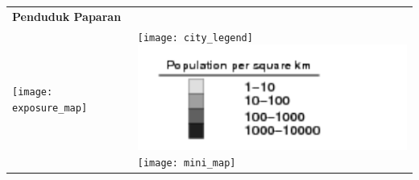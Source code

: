 \documentclass[a4paper]{article}
\begin{document}


\bigskip


\bigskip


\bigskip
\begin{tabular}{@{}l@{}l}
  \Large \textbf{Penduduk Paparan} & \\
  \parbox[t]{0.7\textwidth}{
    \vspace{0pt}
    \texttt{[image: exposure\_map]}} &
  \hspace{-8mm}
  \parbox[t]{0.3\textwidth}{
    \vspace{2mm}
    \texttt{[image: city\_legend]} \\
    \includegraphics{population_legend}\\
    \texttt{[image: mini\_map]}
  }
\end{tabular}
\end{document}
